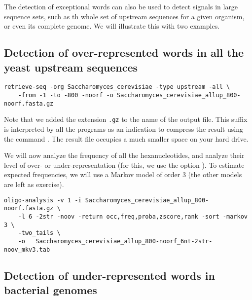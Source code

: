 The detection of exceptional words can also be used to detect signals
in large sequence sets, such as th whole set of upstream sequences for
a given organism, or even its complete genome. We will illustrate this
with two examples.

\subsection{Detection of over-represented words in all the yeast
  upstream   sequences}

{\color{Blue} \begin{footnotesize} 
\begin{verbatim}
retrieve-seq -org Saccharomyces_cerevisiae -type upstream -all \
    -from -1 -to -800 -noorf -o Saccharomyces_cerevisiae_allup_800-noorf.fasta.gz
\end{verbatim} \end{footnotesize}
}

Note that we added the extension \texttt{.gz} to the name of the
output file. This suffix is interpreted by all the \RSAT programs as
an indication to compress the result using the command
. The result file occupies a much smaller space on your
hard drive.

We will now analyze the frequency of all the hexanucleotides, and
analyze their level of over- or under-representation (for this, we use
the option \option{-two\_tails}). To estimate expected frequencies, we
will use a Markov model of order 3 (the other models are left as
exercise).

{\color{Blue} \begin{footnotesize} 
\begin{verbatim}
oligo-analysis -v 1 -i Saccharomyces_cerevisiae_allup_800-noorf.fasta.gz \
    -l 6 -2str -noov -return occ,freq,proba,zscore,rank -sort -markov 3 \
    -two_tails \
    -o   Saccharomyces_cerevisiae_allup_800-noorf_6nt-2str-noov_mkv3.tab
\end{verbatim} \end{footnotesize}
}


\subsection{Detection of under-represented words in bacterial genomes}




